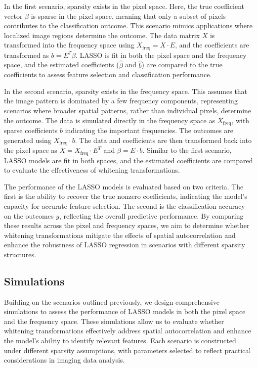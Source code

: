 \documentclass[12pt]{article}
\begin{document}
In the first scenario, sparsity exists in the pixel space. Here, the true coefficient vector \( \beta \) is sparse in the pixel space, meaning that only a subset of pixels contributes to the classification outcome. This scenario mimics applications where localized image regions determine the outcome. The data matrix \( X \) is transformed into the frequency space using \( X_{\text{freq}} = X \cdot E \), and the coefficients are transformed as \( b = E^T \beta \). LASSO is fit in both the pixel space and the frequency space, and the estimated coefficients (\( \hat{\beta} \) and \( \hat{b} \)) are compared to the true coefficients to assess feature selection and classification performance.

In the second scenario, sparsity exists in the frequency space. This assumes that the image pattern is dominated by a few frequency components, representing scenarios where broader spatial patterns, rather than individual pixels, determine the outcome. The data is simulated directly in the frequency space as \( X_{\text{freq}} \), with sparse coefficients \( b \) indicating the important frequencies. The outcomes are generated using \( X_{\text{freq}} \cdot b \). The data and coefficients are then transformed back into the pixel space as \( X = X_{\text{freq}} \cdot E^T \) and \( \beta = E \cdot b \). Similar to the first scenario, LASSO models are fit in both spaces, and the estimated coefficients are compared to evaluate the effectiveness of whitening transformations.

The performance of the LASSO models is evaluated based on two criteria. The first is the ability to recover the true nonzero coefficients, indicating the model's capacity for accurate feature selection. The second is the classification accuracy on the outcomes \( y \), reflecting the overall predictive performance. By comparing these results across the pixel and frequency spaces, we aim to determine whether whitening transformations mitigate the effects of spatial autocorrelation and enhance the robustness of LASSO regression in scenarios with different sparsity structures.



\subsection{Simulations}

Building on the scenarios outlined previously, we design comprehensive simulations to assess the performance of LASSO models in both the pixel space and the frequency space. These simulations allow us to evaluate whether whitening transformations effectively address spatial autocorrelation and enhance the model's ability to identify relevant features. Each scenario is constructed under different sparsity assumptions, with parameters selected to reflect practical considerations in imaging data analysis.
\end{document}
